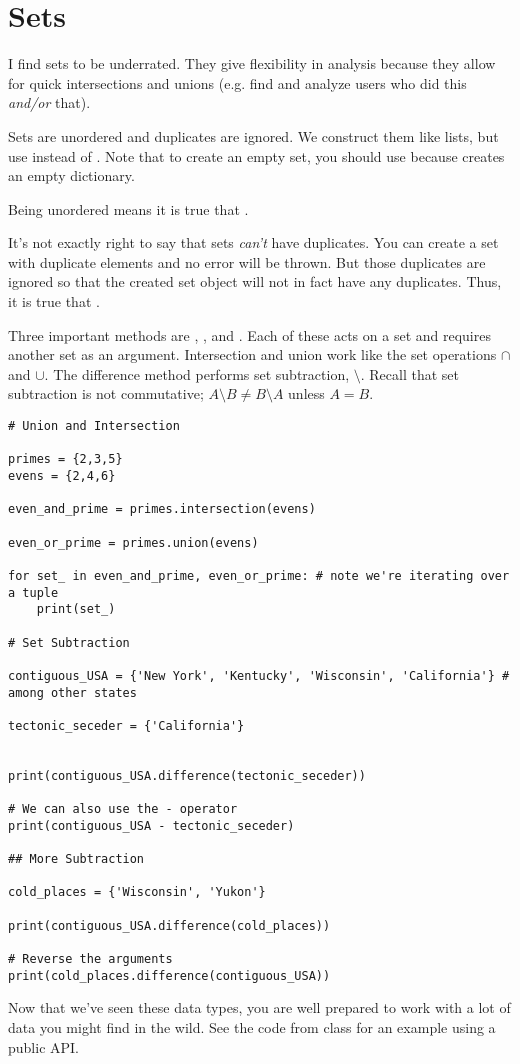 \section{Sets}
\smallskip

I find sets to be underrated. They give flexibility in analysis because they allow for quick intersections and unions (e.g. find and analyze users who did this \emph{and/or} that).

\smallskip
\noindent Sets are unordered and duplicates are ignored. We construct them like lists, but use \code{\{\}} instead of \code{[]}. Note that to create an empty set, you should use  because \code{\{\}} creates an empty dictionary. 


\smallskip
\noindent Being unordered means it is true that .


\smallskip
\noindent It's not exactly right to say that sets \emph{can't} have duplicates. You can create a set with duplicate elements and no error will be thrown. But those duplicates are ignored so that the created set object will not in fact have any duplicates. Thus, it is true that .


\bigskip Three important methods are , , and . Each of these acts on a set and requires another set as an argument. Intersection and union work like the set operations $\cap$ and $\cup$. The difference method performs set subtraction, $\setminus$. Recall that set subtraction is not commutative; $A\setminus B \neq B\setminus A$ unless $A = B$. 

\begin{lstlisting}
# Union and Intersection

primes = {2,3,5}
evens = {2,4,6}

even_and_prime = primes.intersection(evens)

even_or_prime = primes.union(evens)

for set_ in even_and_prime, even_or_prime: # note we're iterating over a tuple
    print(set_)
    
# Set Subtraction

contiguous_USA = {'New York', 'Kentucky', 'Wisconsin', 'California'} # among other states

tectonic_seceder = {'California'}


print(contiguous_USA.difference(tectonic_seceder))

# We can also use the - operator
print(contiguous_USA - tectonic_seceder)

## More Subtraction 

cold_places = {'Wisconsin', 'Yukon'}

print(contiguous_USA.difference(cold_places))

# Reverse the arguments
print(cold_places.difference(contiguous_USA))
\end{lstlisting}


\bigskip

Now that we've seen these data types, you are well prepared to work with a lot of data you might find in the wild. See the code from class for an example using a public API. 